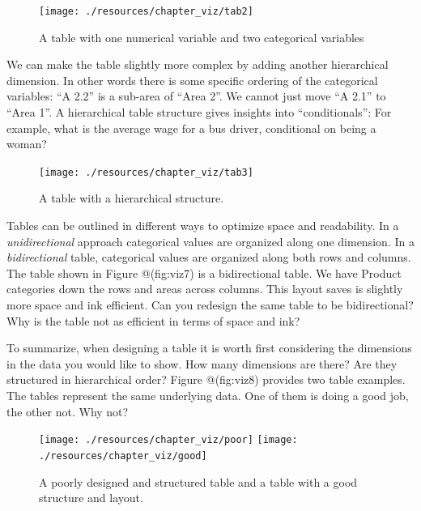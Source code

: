 \documentclass[
]{book}
\begin{document}
\begin{figure}

{\centering \texttt{[image: ./resources/chapter\_viz/tab2]} 

}

\caption{A table with one numerical variable and two categorical variables}\label{fig:viz6}
\end{figure}

We can make the table slightly more complex by adding another hierarchical dimension. In other words there is some specific ordering of the categorical variables: ``A 2.2'' is a sub-area of ``Area 2''. We cannot just move ``A 2.1'' to ``Area 1''. A hierarchical table structure gives insights into ``conditionals'': For example, what is the average wage for a bus driver, conditional on being a woman?

\begin{figure}

{\centering \texttt{[image: ./resources/chapter\_viz/tab3]} 

}

\caption{A table with a hierarchical structure.}\label{fig:viz7}
\end{figure}

Tables can be outlined in different ways to optimize space and readability. In a \emph{unidirectional} approach categorical values are organized along one dimension. In a \emph{bidirectional} table, categorical values are organized along both rows and columns. The table shown in Figure @(fig:viz7) is a bidirectional table. We have Product categories down the rows and areas across columns. This layout saves is slightly more space and ink efficient. Can you redesign the same table to be bidirectional? Why is the table not as efficient in terms of space and ink?

To summarize, when designing a table it is worth first considering the dimensions in the data you would like to show. How many dimensions are there? Are they structured in hierarchical order? Figure @(fig:viz8) provides two table examples. The tables represent the same underlying data. One of them is doing a good job, the other not. Why not?

\begin{figure}

{\centering \texttt{[image: ./resources/chapter\_viz/poor]} \texttt{[image: ./resources/chapter\_viz/good]} 

}

\caption{A poorly designed and structured table and a table with a good structure and layout.}\label{fig:viz8}
\end{figure}
\end{document}
